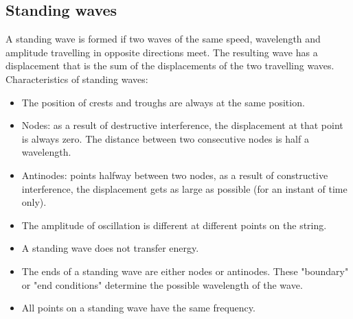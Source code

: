 \subsection{Standing waves}
A standing wave is formed if two waves of the same speed, wavelength and amplitude travelling in opposite directions meet.
The resulting wave has a displacement that is the sum of the displacements of the two travelling waves.\\
Characteristics of standing waves:
\begin{itemize}
  \item The position of crests and troughs are always at the same position.
  \item Nodes: as a result of destructive interference, the displacement at that point is always zero. The distance between two consecutive nodes is half a wavelength.
  \item Antinodes: points halfway between two nodes, as a result of constructive interference, the displacement gets as large as possible (for an instant of time only).
  \item The amplitude of oscillation is different at different points on the string.
  \item A standing wave does not transfer energy.
  \item The ends of a standing wave are either nodes or antinodes. These "boundary" or "end conditions" determine the possible wavelength of the wave.
  \item All points on a standing wave have the same frequency.
\end{itemize}
